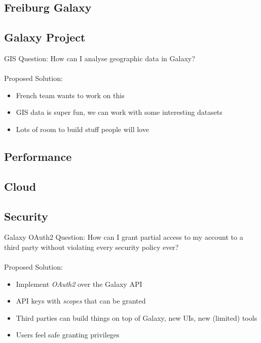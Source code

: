 \documentclass[12pt]{ufrslides}
\begin{document}
\subsection{Freiburg Galaxy}

\subsection{Galaxy Project}

	\begin{frame}{GIS}
		Question: How can I analyse geographic data in Galaxy? \\ \ \\
		Proposed Solution:
		\begin{itemize}
			\item French team wants to work on this
			\item GIS data is super fun, we can work with some interesting datasets
			\item Lots of room to build stuff people will love
		\end{itemize}
	\end{frame}

\subsection{Performance}

\subsection{Cloud}

\subsection{Security}

	\begin{frame}{Galaxy OAuth2}
		Question: How can I grant partial access to my account to a third party without violating every security policy ever? \\ \ \\
		Proposed Solution:
		\begin{itemize}
			\item Implement \emph{OAuth2} over the Galaxy API
			\item API keys with \emph{scopes} that can be granted
			\item Third parties can build things on top of Galaxy, new UIs, new (limited) tools
			\item Users feel safe granting privileges
		\end{itemize}
	\end{frame}
\end{document}
